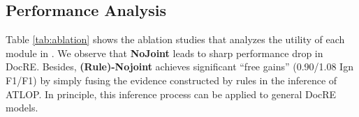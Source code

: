 \begin{table}[t]
\centering
{}
    \upv
    \caption{Ablation study for evidence extraction.}
    \label{tab:evi_ablation}
    \downv
\end{table}

\subsection{Performance Analysis}



 Table \ref{tab:ablation} shows the ablation studies that analyzes the utility of each module in \ours.
We observe that \textbf{NoJoint} leads to sharp performance drop in DocRE.
Besides, \textbf{\ours (Rule)-Nojoint} achieves significant ``free gains'' (0.90/1.08 Ign F1/F1) by simply fusing the evidence constructed by rules in the inference of ATLOP. In principle, this inference process can be applied to general DocRE models.



\begin{table}[!t]
\centering
{}
    \upv
    \caption{Ablation study of \ours on DocRED.}
    \label{tab:ablation}
    \downv
\end{table}

